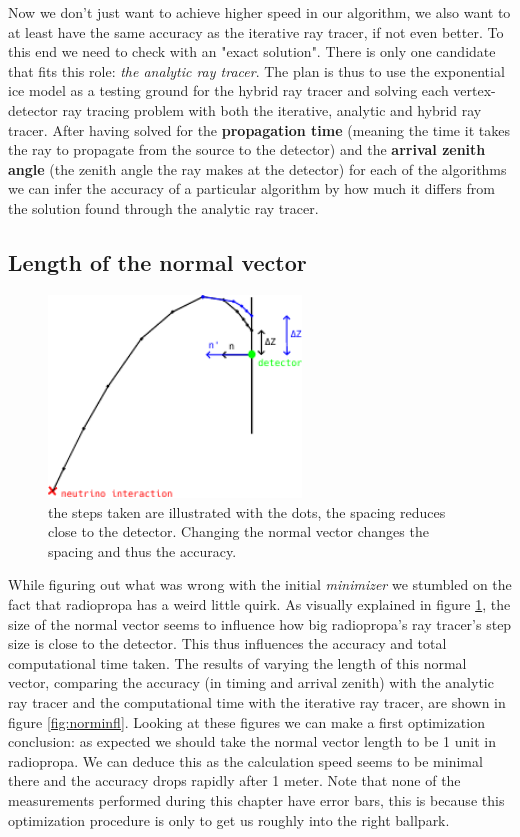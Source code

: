Now we don't just want to achieve higher speed in our algorithm, we also want
to at least have the same accuracy as the iterative ray tracer, if not even better.
To this end we need to check with an "exact solution". There is only one candidate
that fits this role: \textit{the analytic ray tracer}. The plan is thus to use the
exponential ice model as a testing ground for the hybrid ray tracer and solving each
vertex-detector ray tracing problem with both the iterative, analytic and hybrid ray tracer.
After having solved for the \textbf{propagation time} (meaning the time it takes the ray to
propagate from the source to the detector) and the \textbf{arrival zenith angle} (the zenith angle
the ray makes at the detector) for each of the algorithms we can infer the accuracy of a particular
algorithm by how much it differs from the solution found through the analytic ray tracer.
\subsection{Length of the normal vector}
\begin{figure}
	\centering
	\includegraphics[width=0.6\textwidth]{figures/PrincipleNormIllu.pdf}
	\caption{the steps taken are illustrated with the dots, the spacing reduces close to the detector. Changing
	the normal vector changes the spacing and thus the accuracy.}
	\label{fig:normexpl}
\end{figure}
While figuring out what was wrong with the initial \textit{minimizer} we
stumbled on the fact that radiopropa has a weird little quirk.  As visually
explained in figure \ref{fig:normexpl}, the size of the normal vector seems to
influence how big radiopropa's ray tracer's step size is close to the
detector.  This thus influences the accuracy and total computational time
taken. The results of varying the length of this normal vector, comparing the
accuracy (in timing and arrival zenith) with the analytic ray tracer and the computational time with the
iterative ray tracer, are shown in figure \ref{fig:norminfl}.  
Looking at these figures we can make a first optimization
conclusion: as expected we should take the normal vector length to be 1 unit in radiopropa.
We can deduce this as the calculation speed seems to be minimal there 
and the accuracy drops rapidly after 1 meter.
Note that none of the measurements performed during this chapter have
error bars, this is because this optimization procedure is only to get
us roughly into the right ballpark.

